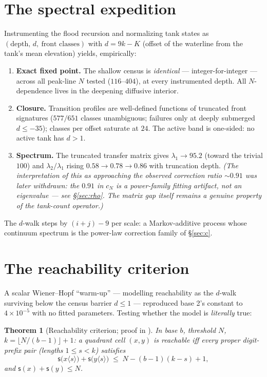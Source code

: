 \documentclass[11pt]{article}
\newtheorem{theorem}{Theorem}
\theoremstyle{definition}
\theoremstyle{remark}
\newcommand{\ds}{\mathsf{s}}
\begin{document}
\section{The spectral expedition}\label{sec:spectral}

Instrumenting the flood recursion and normalizing tank states as
$(\text{depth},\, d,\ \text{front classes})$ with $d=9k-K$ (offset of the
waterline from the tank's mean elevation) yields, empirically:

\begin{enumerate}
\item \textbf{Exact fixed point.} The shallow census is \emph{identical} ---
integer-for-integer --- across all peak-line $N$ tested ($116$--$404$), at every
instrumented depth. All $N$-dependence lives in the deepening diffusive interior.
\item \textbf{Closure.} Transition profiles are well-defined functions of
truncated front signatures ($577/651$ classes unambiguous; failures only at
deeply submerged $d\le-35$); classes per offset saturate at $24$. The active band
is one-sided: no active tank has $d>1$.
\item \textbf{Spectrum.} The truncated transfer matrix gives $\lambda_1\to95.2$
(toward the trivial $100$) and $\lambda_2/\lambda_1$ rising
$0.58\to0.78\to0.86$ with truncation depth. \emph{(The interpretation of this as
approaching the observed correction ratio ${\sim}0.91$ was later withdrawn: the
$0.91$ in $c_N$ is a power-family fitting artifact, not an eigenvalue --- see
\S\ref{sec:rho}. The matrix gap itself remains a genuine property of the
tank-count operator.)}
\end{enumerate}

The $d$-walk steps by $(i+j)-9$ per scale: a Markov-additive process whose
continuum spectrum is the power-law correction family of \S\ref{sec:c}.

\section{The reachability criterion}\label{sec:criterion}

A scalar Wiener--Hopf ``warm-up'' --- modelling reachability as the $d$-walk
surviving below the census barrier $d\le1$ --- reproduced base 2's constant to
$4\times10^{-5}$ with no fitted parameters. Testing whether the model is
\emph{literally} true:

\begin{theorem}[Reachability criterion; proof in \cite{criterion}]
In base $b$, threshold $N$, $k=\lfloor N/(b{-}1)\rfloor+1$: a quadrant cell
$(x,y)$ is reachable iff every proper digit-prefix pair
\emph{(lengths $1\le s<k$)} satisfies
\[
\ds\bigl(x\langle s\rangle\bigr)+\ds\bigl(y\langle s\rangle\bigr)\;\le\;
N-(b{-}1)(k{-}s)+1 ,
\]
and $\ds(x)+\ds(y)\le N$.
\end{theorem}
\end{document}
